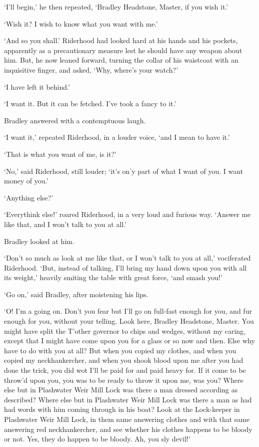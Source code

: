 ‘I’ll begin,’ he then repeated, ‘Bradley Headstone, Master, if you wish
it.’

‘Wish it? I wish to know what you want with me.’

‘And so you shall.’ Riderhood had looked hard at his hands and his
pockets, apparently as a precautionary measure lest he should have any
weapon about him. But, he now leaned forward, turning the collar of
his waistcoat with an inquisitive finger, and asked, ‘Why, where’s your
watch?’

‘I have left it behind.’

‘I want it. But it can be fetched. I’ve took a fancy to it.’

Bradley answered with a contemptuous laugh.

‘I want it,’ repeated Riderhood, in a louder voice, ‘and I mean to have
it.’

‘That is what you want of me, is it?’

‘No,’ said Riderhood, still louder; ‘it’s on’y part of what I want of
you. I want money of you.’

‘Anything else?’

‘Everythink else!’ roared Riderhood, in a very loud and furious way.
‘Answer me like that, and I won’t talk to you at all.’

Bradley looked at him.

‘Don’t so much as look at me like that, or I won’t talk to you at all,’
vociferated Riderhood. ‘But, instead of talking, I’ll bring my hand
down upon you with all its weight,’ heavily smiting the table with great
force, ‘and smash you!’

‘Go on,’ said Bradley, after moistening his lips.

‘O! I’m a going on. Don’t you fear but I’ll go on full-fast enough for
you, and fur enough for you, without your telling. Look here, Bradley
Headstone, Master. You might have split the T’other governor to chips
and wedges, without my caring, except that I might have come upon you
for a glass or so now and then. Else why have to do with you at all? But
when you copied my clothes, and when you copied my neckhankercher, and
when you shook blood upon me after you had done the trick, you did wot
I’ll be paid for and paid heavy for. If it come to be throw’d upon you,
you was to be ready to throw it upon me, was you? Where else but
in Plashwater Weir Mill Lock was there a man dressed according as
described? Where else but in Plashwater Weir Mill Lock was there a
man as had had words with him coming through in his boat? Look at the
Lock-keeper in Plashwater Weir Mill Lock, in them same answering clothes
and with that same answering red neckhankercher, and see whether his
clothes happens to be bloody or not. Yes, they do happen to be bloody.
Ah, you sly devil!’

